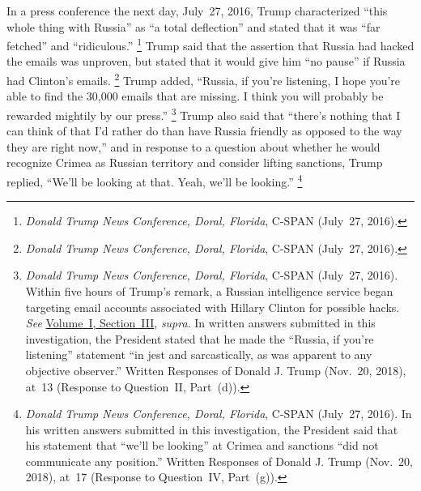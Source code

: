In a press conference the next day, July~27, 2016, Trump characterized ``this whole thing with Russia'' as ``a total deflection'' and stated that it was ``far fetched'' and ``ridiculous.''%
\footnote{\textit{Donald Trump News Conference, Doral, Florida}, C-SPAN (July~27, 2016).}
Trump said that the assertion that Russia had hacked the emails was unproven, but stated that it would give him ``no pause'' if Russia had Clinton's emails.%
\footnote{\textit{Donald Trump News Conference, Doral, Florida}, C-SPAN (July~27, 2016).}
Trump added, ``Russia, if you're listening, I hope you're able to find the 30,000 emails that are missing. I think you will probably be rewarded mightily by our press.''%
\footnote{\textit{Donald Trump News Conference, Doral, Florida}, C-SPAN (July~27, 2016).
Within five hours of Trump's remark, a Russian intelligence service began targeting email accounts associated with Hillary Clinton for possible hacks.
\textit{See} \hyperlink{section.1.3}{Volume~I, Section~III}, \textit{supra}.
In written answers submitted in this investigation, the President stated that he made the ``Russia, if you're listening'' statement ``in jest and sarcastically, as was apparent to any objective observer.''
Written Responses of Donald J. Trump (Nov.~20, 2018), at~13 (Response to Question~II, Part~(d)).}
Trump also said that ``there's nothing that I can think of that I'd rather do than have Russia friendly as opposed to the way they are right now,'' and in response to a question about whether he would recognize Crimea as Russian territory and consider lifting sanctions, Trump replied, ``We'll be looking at that. Yeah, we'll be looking.''%
\footnote{\textit{Donald Trump News Conference, Doral, Florida}, C-SPAN (July~27, 2016).
In his written answers submitted in this investigation, the President said that his statement that ``we'll be looking'' at Crimea and sanctions ``did not communicate any position.''
Written Responses of Donald J. Trump (Nov.~20, 2018), at~17 (Response to Question~IV, Part~(g)).}

